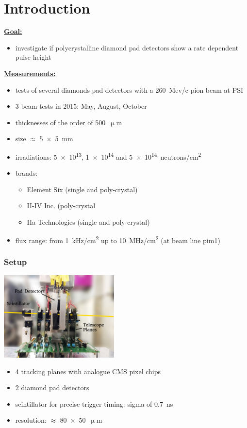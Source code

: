 \documentclass[9pt]{beamer}
\begin{document}
\section{Introduction}
\begin{frame}
	\underline{\textbf{Goal:}}
	\begin{itemize}
		\item investigate if polycrystalline diamond pad detectors show a rate dependent pulse height
	\end{itemize}
	\vspace*{1cm}
	\underline{\textbf{Measurements:}}
	\begin{itemize}
		\setlength{\itemsep}{\fill}
		\item tests of several diamonds pad detectors with a \SI{260}{Mev/c} pion beam at PSI
		\item 3 beam tests in $2015$: May, August, October
		\item thicknesses of the order of \SI{500}{$\upmu$m}
		\item size $\approx$ \SI{5x5}{mm}
		\item irradiations: \num[exponent-product = \cdot]{5e13}, \num[exponent-product = \cdot]{1e14} and \SI[exponent-product = \cdot]{5e14}{neutrons/cm^{2}}
		\item brands:
		\begin{itemize}
			\item Element Six (single and poly-crystal)
			\item II-IV Inc. (poly-crystal
			\item IIa Technologies (single and poly-crystal)
		\end{itemize}
		\item flux range: from \SI{1}{kHz/cm^{2}} up to \SI{10}{MHz/cm^{2}} (at beam line pim1)
	\end{itemize}
\end{frame}
\begin{frame}
	\frametitle{Setup}
	\begin{center}
		\includegraphics[width=6cm]{Setup}
	\end{center}
	\begin{itemize}
		\setlength{\itemsep}{\fill}
		\item 4 tracking planes with analogue CMS pixel chips
		\item 2 diamond pad detectors
		\item scintillator for precise trigger timing: sigma of \SI{.7}{ns}
		\item resolution: $\approx$ \SI{80x50}{$\upmu$m}
	\end{itemize}
\end{frame}
\end{document}
